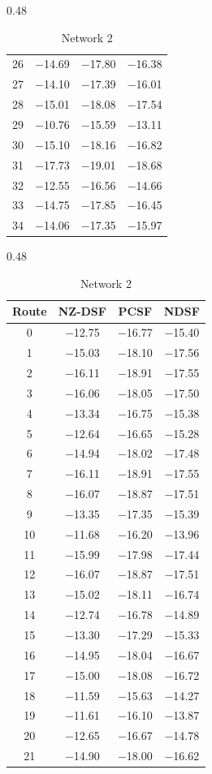 \documentclass[12pt,a4paper]{article}
\begin{document}
\begin{table}[H]
\begin{subtable}[t]{0.48\textwidth}
\begin{tabular}{cccc}
26 & $-$14.69 & $-$17.80 & $-$16.38 \\
27 & $-$14.10 & $-$17.39 & $-$16.01 \\
28 & $-$15.01 & $-$18.08 & $-$17.54 \\
29 & $-$10.76 & $-$15.59 & $-$13.11 \\
30 & $-$15.10 & $-$18.16 & $-$16.82 \\
31 & $-$17.73 & $-$19.01 & $-$18.68 \\
32 & $-$12.55 & $-$16.56 & $-$14.66 \\
33 & $-$14.75 & $-$17.85 & $-$16.45 \\
34 & $-$14.06 & $-$17.35 & $-$15.97 \\
\bottomrule
\end{tabular}
\end{subtable}
\hfill
\begin{subtable}[t]{0.48\textwidth}
\centering
\caption{Network 2}
\begin{tabular}{cccc}
\toprule
Route & NZ-DSF & PCSF & NDSF \\
\midrule
0  & $-$12.75 & $-$16.77 & $-$15.40 \\
1  & $-$15.03 & $-$18.10 & $-$17.56 \\
2  & $-$16.11 & $-$18.91 & $-$17.55 \\
3  & $-$16.06 & $-$18.05 & $-$17.50 \\
4  & $-$13.34 & $-$16.75 & $-$15.38 \\
5  & $-$12.64 & $-$16.65 & $-$15.28 \\
6  & $-$14.94 & $-$18.02 & $-$17.48 \\
7  & $-$16.11 & $-$18.91 & $-$17.55 \\
8  & $-$16.07 & $-$18.87 & $-$17.51 \\
9  & $-$13.35 & $-$17.35 & $-$15.39 \\
10 & $-$11.68 & $-$16.20 & $-$13.96 \\
11 & $-$15.99 & $-$17.98 & $-$17.44 \\
12 & $-$16.07 & $-$18.87 & $-$17.51 \\
13 & $-$15.02 & $-$18.11 & $-$16.74 \\
14 & $-$12.74 & $-$16.78 & $-$14.89 \\
15 & $-$13.30 & $-$17.29 & $-$15.33 \\
16 & $-$14.95 & $-$18.04 & $-$16.67 \\
17 & $-$15.00 & $-$18.08 & $-$16.72 \\
18 & $-$11.59 & $-$15.63 & $-$14.27 \\
19 & $-$11.61 & $-$16.10 & $-$13.87 \\
20 & $-$12.65 & $-$16.67 & $-$14.78 \\
21 & $-$14.90 & $-$18.00 & $-$16.62 \\
\bottomrule
\end{tabular}
\end{subtable}
\end{table}
\end{document}
